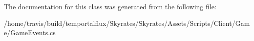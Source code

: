 The documentation for this class was generated from the following file\-:\begin{DoxyCompactItemize}
\item 
/home/travis/build/temportalflux/\-Skyrates/\-Skyrates/\-Assets/\-Scripts/\-Client/\-Game/Game\-Events.\-cs\end{DoxyCompactItemize}
